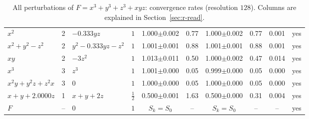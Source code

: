 \documentclass[12pt, a4paper]{article}
\theoremstyle{plain}
\theoremstyle{definition}
\theoremstyle{remark}
\theoremstyle{definition}
\begin{document}
\begin{table}[!h]
\begin{adjustbox}{max width=\textwidth}
\begin{tabular}{l c l c c c c c c c}
$x^2$ & 2 & $-0.333yz$ & $1$ & 1.000{\scriptsize$\pm$0.002} & 0.77 & 1.000{\scriptsize$\pm$0.002} & 0.77 & 0.001 & yes \\
$x^2+y^2-z^2$ & 2 & $y^2 - 0.333yz - z^2$ & $1$ & 1.001{\scriptsize$\pm$0.001} & 0.88 & 1.001{\scriptsize$\pm$0.001} & 0.88 & 0.001 & yes \\
$xy$ & 2 & $-3z^2$ & $1$ & 1.013{\scriptsize$\pm$0.011} & 0.50 & 1.000{\scriptsize$\pm$0.002} & 0.47 & 0.014 & yes \\
$x^3$ & 3 & $z^3$ & $1$ & 1.001{\scriptsize$\pm$0.000} & 0.05 & 0.999{\scriptsize$\pm$0.000} & 0.05 & 0.000 & yes \\
$x^2y+y^2z+z^2x$ & 3 & $0$ & $1$ & 1.000{\scriptsize$\pm$0.000} & 0.05 & 1.000{\scriptsize$\pm$0.000} & 0.05 & 0.000 & yes \\
$x+y+2.0000z$ & 1 & $x + y + 2z$ & $\tfrac12$ & 0.500{\scriptsize$\pm$0.001} & 1.63 & 0.500{\scriptsize$\pm$0.000} & 0.31 & 0.004 & yes \\
$F$ & -- & $0$ & $1$ & $S_k=S_0$ & -- & $S_k=S_0$ & -- & -- & yes \\
\bottomrule
\end{tabular}
\end{adjustbox}
\caption[Rates for $x^3+y^3+z^3+xyz$]{All perturbations of $F=x^3+y^3+z^3+xyz$: convergence rates (resolution $128$). Columns are explained in Section~\ref{sec:r-read}.}
\label{tab:r-E6c-rates}
\end{table}
\end{document}
